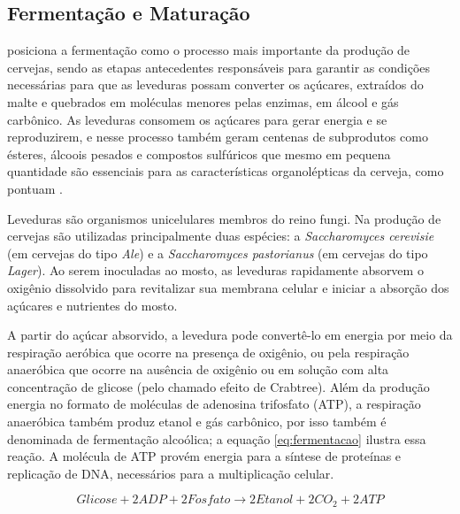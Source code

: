 \subsection{Fermentação e Maturação}


 posiciona a fermentação como o processo mais importante da produção de cervejas, sendo as etapas
antecedentes responsáveis para garantir as condições necessárias para que as leveduras possam converter os açúcares,
extraídos do malte e quebrados em moléculas menores pelas enzimas, em álcool e gás carbônico. As leveduras consomem 
os açúcares para gerar energia e se reproduzirem, e nesse processo também geram centenas de subprodutos como ésteres, álcoois pesados e compostos sulfúricos que mesmo em pequena quantidade são essenciais para as características organolépticas da cerveja, como
pontuam .

Leveduras são organismos unicelulares membros do reino fungi. Na produção de cervejas são utilizadas principalmente 
duas espécies: a \textit{Saccharomyces cerevisie} (em cervejas do tipo \textit{Ale}) e a \textit{Saccharomyces pastorianus} (em cervejas do tipo \textit{Lager}). Ao serem inoculadas ao mosto, as leveduras rapidamente absorvem o oxigênio dissolvido para revitalizar sua membrana celular e iniciar a absorção dos açúcares e nutrientes do mosto. 

A partir do açúcar absorvido, a levedura pode convertê-lo em energia por meio da respiração aeróbica que ocorre na presença de oxigênio, ou pela respiração anaeróbica que ocorre na ausência de oxigênio ou em solução com alta concentração de glicose (pelo chamado efeito de Crabtree). 
Além da produção energia no formato de moléculas de adenosina trifosfato (ATP), a respiração anaeróbica também produz etanol e gás carbônico, por isso também é denominada de fermentação alcoólica; a equação \ref{eq:fermentacao} ilustra essa reação. A molécula de ATP provém energia para a síntese de proteínas e replicação de DNA, necessários para a multiplicação celular.

\begin{equation}
    Glicose + 2 ADP + 2 Fosfato \longrightarrow 2 Etanol + 2 CO_2 + 2 ATP
    \label{eq:fermentacao}
\end{equation}

